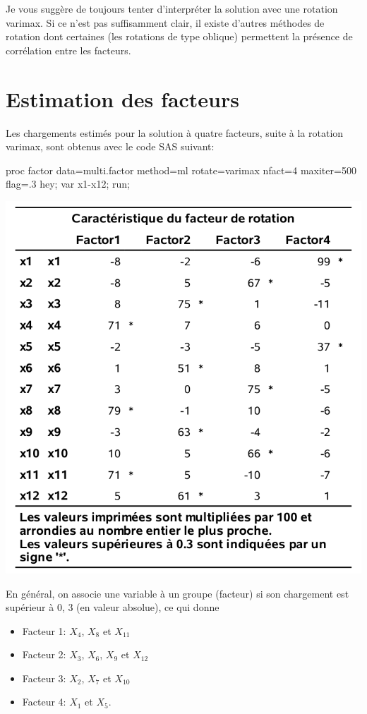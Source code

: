 \documentclass[
  11pt,
  letterpaper,
]{book}
\newenvironment{Shaded}{\begin{snugshade}}{\end{snugshade}}
\newcommand{\NormalTok}[1]{#1}
\providecommand{\tightlist}{%
  \setlength{\itemsep}{0pt}\setlength{\parskip}{0pt}}
\theoremstyle{definition}
\theoremstyle{definition}
\theoremstyle{definition}
\theoremstyle{definition}
\theoremstyle{remark}
\begin{document}
Je vous suggère de toujours tenter d'interpréter la solution avec une rotation varimax. Si ce n'est pas suffisamment clair, il existe d'autres méthodes de rotation dont certaines (les rotations de type oblique) permettent la présence de corrélation entre les facteurs.

\hypertarget{estimation-des-facteurs}{%
\section{Estimation des facteurs}\label{estimation-des-facteurs}}

Les chargements estimés pour la solution à quatre facteurs, suite à la rotation varimax, sont obtenus avec le code SAS suivant:

\begin{Shaded}
\begin{Highlighting}[]
\NormalTok{proc factor data=multi.factor }
\NormalTok{ method=ml rotate=varimax nfact=4}
\NormalTok{ maxiter=500 flag=.3 hey;}
\NormalTok{ var x1{-}x12;}
\NormalTok{run;}
\end{Highlighting}
\end{Shaded}

\begin{center}\includegraphics[width=0.7\linewidth]{figures/01-facto-e3} \end{center}

En général, on associe une variable à un groupe (facteur) si son chargement est supérieur à 0, 3 (en valeur absolue), ce qui donne

\begin{itemize}
\tightlist
\item
  Facteur 1: \(X_4\), \(X_8\) et \(X_{11}\)
\item
  Facteur 2: \(X_3\), \(X_6\), \(X_9\) et \(X_{12}\)
\item
  Facteur 3: \(X_2\), \(X_7\) et \(X_{10}\)
\item
  Facteur 4: \(X_1\) et \(X_5\).
\end{itemize}
\end{document}
